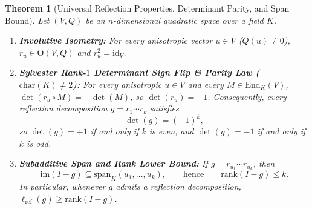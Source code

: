 \documentclass[11pt,a4paper]{article}
\theoremstyle{plain}
\newtheorem{theorem}{Theorem}[section]
\theoremstyle{definition}
\newcommand{\Orth}{\mathrm{O}}
\newcommand{\lref}{\ell_{\mathrm{ref}}}
\newcommand{\rk}{\mathrm{rank}}
\newcommand{\im}{\mathrm{im}}
\newcommand{\spn}{\mathrm{span}}
\begin{document}
\begin{theorem}[Universal Reflection Properties, Determinant Parity, and Span Bound]
\label{thm:positive}
Let $(V, Q)$ be an $n$-dimensional quadratic space over a field $K$.
\begin{enumerate}
\item \textbf{Involutive Isometry:} For every anisotropic vector $u \in V$ ($Q(u) \neq 0$), $r_u \in \Orth(V, Q)$ and $r_u^2 = \mathrm{id}_V$.
\item \textbf{Sylvester Rank-$1$ Determinant Sign Flip \& Parity Law ($\mathrm{char}(K) \neq 2$):} For every anisotropic $u \in V$ and every $M \in \mathrm{End}_K(V)$, $\det(r_u \circ M) = -\det(M)$, so $\det(r_u) = -1$. Consequently, every reflection decomposition $g = r_1 \cdots r_k$ satisfies
\begin{equation}\label{eq:parity}
  \det(g) = (-1)^k,
\end{equation}
so $\det(g) = +1$ if and only if $k$ is even, and $\det(g) = -1$ if and only if $k$ is odd.
\item \textbf{Subadditive Span and Rank Lower Bound:} If $g = r_{u_1} \cdots r_{u_k}$, then
\begin{equation}\label{eq:span-bound}
  \im(I - g) \subseteq \spn_K(u_1, \dots, u_k), \qquad \text{hence} \qquad \rk(I - g) \le k.
\end{equation}
In particular, whenever $g$ admits a reflection decomposition, $\lref(g) \ge \rk(I - g)$.
\end{enumerate}
\end{theorem}
\end{document}
